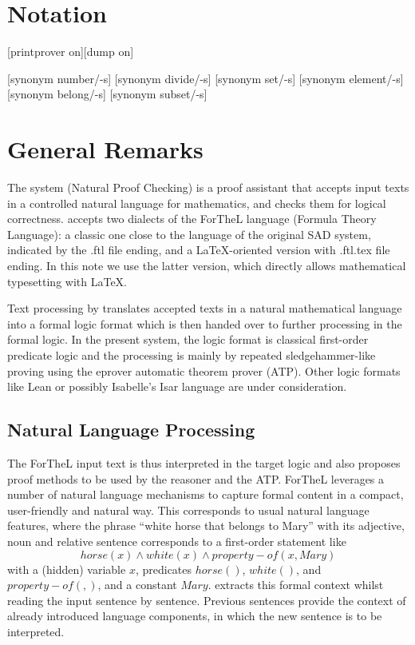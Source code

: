 \documentclass[11pt]{article}
\begin{document}
\section{Notation}

\begin{forthel}

[printprover on][dump on]

[synonym number/-s]
[synonym divide/-s]
[synonym set/-s] [synonym element/-s] 
[synonym belong/-s] [synonym subset/-s]

\end{forthel}

\section{General Remarks}

The \Naproche{} system (Natural Proof Checking)
is a proof assistant that 
accepts input texts 
in a controlled natural language for mathematics, and checks
them for logical correctness. \Naproche{} accepts
two dialects of the ForTheL language (Formula Theory Language):
a classic one close to the language of the original SAD system,
indicated by the .ftl file ending,
and a LaTeX-oriented version with .ftl.tex file ending.
In this note we use the latter version, which directly allows
mathematical typesetting with \LaTeX.

Text processing by \Naproche{} translates accepted texts in a natural 
mathematical language into a formal logic format which is 
then handed over to further processing in the formal logic.
In the present \Naproche{} system, the logic format is classical
first-order predicate logic and the processing is mainly by
repeated sledgehammer-like proving using the eprover automatic
theorem prover (ATP).
Other logic formats like Lean or possibly Isabelle's Isar
language are under consideration.

\subsection{Natural Language Processing}

The ForTheL input text is thus interpreted in the target logic
and also proposes proof methods to be used by the reasoner
and the ATP. ForTheL leverages a number of natural language
mechanisms to capture formal content in a compact, user-friendly
and natural way. This corresponds to usual natural language
features, where the phrase ``white horse that belongs 
to Mary'' with its adjective, noun and relative sentence 
corresponds to a first-order statement like
$$horse(x) \wedge white(x) \wedge property-of(x,Mary)$$
with a (hidden) variable $x$, predicates $horse()$, 
$white()$, and $property-of( , )$, and a constant $Mary$.
\Naproche{} extracts this formal context whilst reading
the input sentence by sentence. Previous sentences provide the context
of already introduced language components, in which the
new sentence is to be interpreted. 
\end{document}
